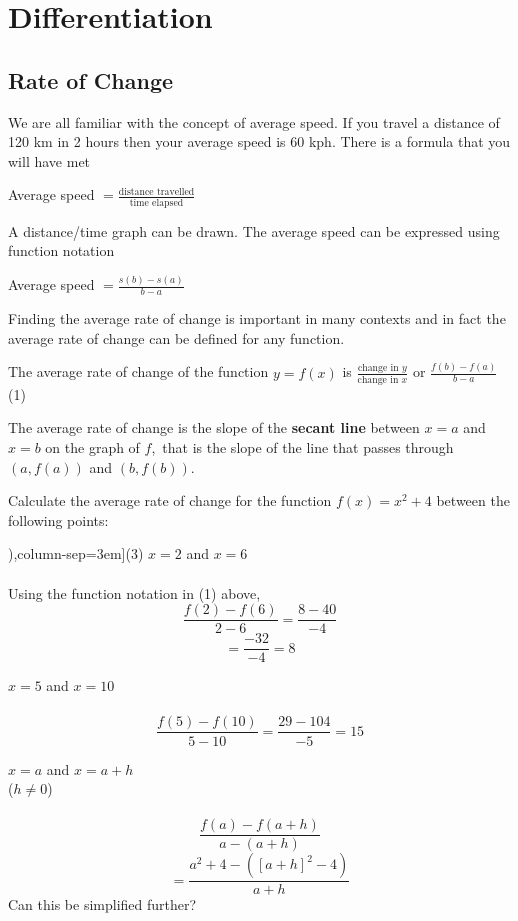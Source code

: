 \chapter[Differentiation]{Differentiation}

\section*{Rate of Change}
We are all familiar with the concept of average speed. If you travel a distance of 120 km in 2 hours then your average speed is 60 kph. There is a formula that you will have met 

\begin{center}
Average speed $ =\frac{\text{distance travelled}}{\text{time elapsed}}$
\end{center}\par
A distance/time graph can be drawn. The average speed can be expressed using function notation 

\begin{center}
Average speed $ =\frac{s (b) -s (a)}{b -a}$
\end{center}\par
Finding the average rate of change is important in many contexts and in fact the average rate of change can be defined for any function. 

The average rate of change of the function $y =f (x)$ is $\frac{\text{change in }y}{\text{change in }x}$ or $\frac{f (b) -f (a)}{b -a}$\hfill(1) 

The average rate of change is the slope of the \textbf{secant line} between $x =a$ and $x =b$ on the graph of $f$,\ that is the slope of the line that passes through $(a ,f (a))$ and $(b ,f (b))$. 

\example Calculate the average rate of change for the function $f (x) =x^{2} +4$ between the following points:
\begin{tasks}[counter-format=(tsk[1]),column-sep=3em](3)
\task $x =2$ and $x =6$ \\
\solution\\ Using the function notation in (1) above, \[\frac{f(2)-f(6)}{2-6}=\frac{8-40}{-4}\]
\[=\frac{-32}{-4}=8\]

\task $x =5$ and $x =10$ \\
\solution\\
\[\frac{f(5)-f(10)}{5-10}=\frac{29-104}{-5}=15\]

\task $x =a$ and $x =a +h$\\ ($h \neq 0$) \\
\solution\\
\[\frac{f(a)-f(a+h)}{a-(a+h)}\]
\[=\frac{a^2+4-([a+h]^2-4)}{a+h}\]
Can this be simplified further?
\end{tasks}

